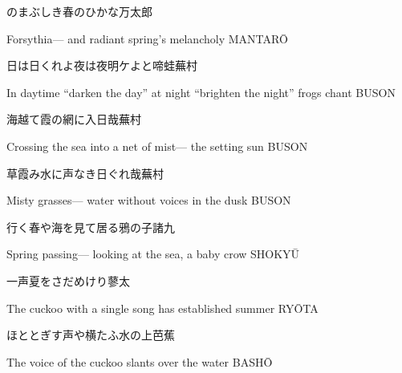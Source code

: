 \begin{haiku}
    {\FH {}のまぶしき春のひかな}\hfill{\FH 万太郎}

    \vin{} Forsythia---
    \vin{} \vin{} and radiant spring's
    \vin{} \vin{} \vin{} melancholy \hspace{\fill} MANTAR\={O}
\end{haiku}

\begin{haiku}
    {\FH 日は日くれよ夜は夜明ケよと啼蛙}\hfill{\FH 蕪村}

    \vin{} In daytime ``darken the day''
    \vin{} \vin{} at night ``brighten the night''
    \vin{} \vin{} \vin{} frogs chant \hspace{\fill} BUSON
\end{haiku}

\begin{haiku}
    {\FH 海越て霞の網に入日哉}\hfill{\FH 蕪村}

    \vin{} Crossing the sea
    \vin{} \vin{} into a net of mist---
    \vin{} \vin{} \vin{} the setting sun \hspace{\fill} BUSON
\end{haiku}

\begin{haiku}
    {\FH 草霞み水に声なき日ぐれ哉}\hfill{\FH 蕪村}

    \vin{} Misty grasses---
    \vin{} \vin{} water without voices
    \vin{} \vin{} \vin{} in the dusk \hspace{\fill} BUSON
\end{haiku}

\begin{haiku}
    {\FH 行く春や海を見て居る鴉の子}\hfill{\FH 諸九}

    \vin{} Spring passing---
    \vin{} \vin{} looking at the sea,
    \vin{} \vin{} \vin{} a baby crow \hspace{\fill} SHOKY\={U}
\end{haiku}

\begin{haiku}
    {\FH {}一声夏をさだめけり}\hfill{\FH 蓼太}

    \vin{} The cuckoo
    \vin{} \vin{} with a single song
    \vin{} \vin{} \vin{} has established summer \hspace{\fill} RY\={O}TA
\end{haiku}

\begin{haiku}
    {\FH ほととぎす声や横たふ水の上}\hfill{\FH 芭蕉}

    \vin{} The voice of the cuckoo
    \vin{} \vin{} slants
    \vin{} \vin{} \vin{} over the water \hspace{\fill} BASH\={O}
\end{haiku}

